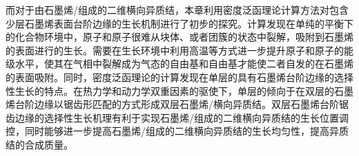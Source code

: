     而对于由石墨烯/组成的二维横向异质结，本章利用密度泛函理论计算方法对包含少层石墨烯表面台阶边缘的生长机制进行了初步的探究。计算发现在单纯的平衡下的化合物环境中，原子和原子很难从块体、或者团簇的状态中裂解，吸附到石墨烯的表面进行的生长。需要在生长环境中利用高温等方式进一步提升原子和原子的能级水平，使其在气相中裂解成为气态的自由基和自由基才能使二者自发的在石墨烯的表面吸附。同时，密度泛函理论的计算发现在单层的具有石墨烯台阶边缘的选择性生长的特点。在热力学和动力学双重因素的驱使下，单层的倾向于在双层的石墨烯台阶边缘以锯齿形匹配的方式形成双层石墨烯/横向异质结。双层石墨烯台阶锯齿边缘的选择性生长机理有利于实现石墨烯/组成的二维横向异质结的生长位置调控，同时能够进一步提高石墨烯/组成的二维横向异质结的生长均匀性，提高异质结的合成质量。